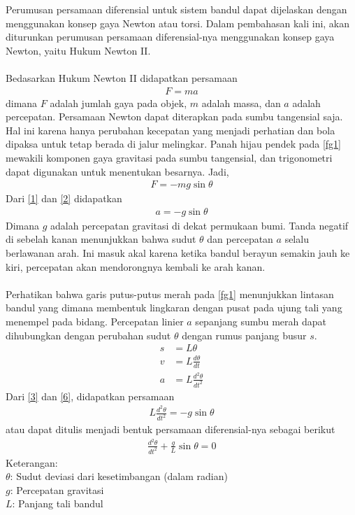 \documentclass{article}
\begin{document}
Perumusan persamaan diferensial untuk sistem bandul dapat dijelaskan dengan menggunakan konsep gaya Newton atau torsi. Dalam pembahasan kali ini, akan diturunkan perumusan persamaan diferensial-nya menggunakan konsep gaya Newton, yaitu Hukum Newton II.\\~\\
Bedasarkan Hukum Newton II didapatkan persamaan
\begin{align}
    F=ma \label{1}
\end{align}
dimana $F$ adalah jumlah gaya pada objek, $m$ adalah massa, dan $a$ adalah percepatan. Persamaan Newton dapat diterapkan pada sumbu tangensial saja. Hal ini karena hanya perubahan kecepatan yang menjadi perhatian dan bola dipaksa untuk tetap berada di jalur melingkar. Panah hijau pendek pada \autoref{fg1} mewakili komponen gaya gravitasi pada sumbu tangensial, dan trigonometri dapat digunakan untuk menentukan besarnya. Jadi,
\begin{align}
    F=-mg\sin\theta \label{2}
\end{align}
Dari \eqref{1} dan \eqref{2} didapatkan
\begin{align}
    a=-g\sin\theta \label{3}
\end{align}
Dimana $g$ adalah percepatan gravitasi di dekat permukaan bumi. Tanda negatif di sebelah kanan menunjukkan bahwa sudut $\theta$ dan percepatan $a$ selalu berlawanan arah. Ini masuk akal karena ketika bandul berayun semakin jauh ke kiri, percepatan akan mendorongnya kembali ke arah kanan.\\~\\
Perhatikan bahwa garis putus-putus merah pada \autoref{fg1} menunjukkan lintasan bandul yang dimana membentuk lingkaran dengan pusat pada ujung tali yang menempel pada bidang. Percepatan linier $a$ sepanjang sumbu merah dapat dihubungkan dengan perubahan sudut $\theta$ dengan rumus panjang busur $s$.
\begin{align}
    s & =L\theta                           \\
    v & =L\frac{d\theta}{dt}               \\
    a & =L\frac{d^2\theta}{dt^2} \label{6}
\end{align}
Dari \eqref{3} dan \eqref{6}, didapatkan persamaan
\begin{align}
    L\frac{d^2\theta}{dt^2}=-g\sin\theta
\end{align}
atau dapat ditulis menjadi bentuk persamaan diferensial-nya sebagai berikut
\begin{align}
    \frac{d^2\theta}{dt^2} + \frac{g}{L} \sin \theta = 0
    \label{2.1}
\end{align}
Keterangan: \\
$\theta$: Sudut deviasi dari kesetimbangan (dalam radian) \\
$g$: Percepatan gravitasi \\
$L$: Panjang tali bandul \\
\end{document}
